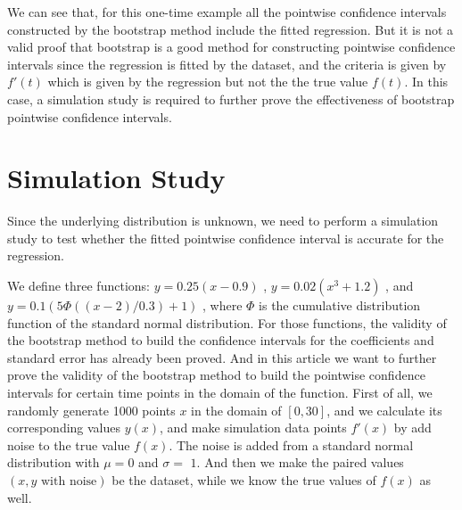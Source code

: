 \documentclass[12pt]{article}
\begin{document}
We can see that, for this one-time example all the pointwise confidence intervals constructed by the bootstrap method include the fitted regression. But it is not a valid proof that bootstrap is a good method for constructing pointwise confidence intervals since the regression is fitted by the dataset, and the criteria is given by \(f'(t)\) which is given by the regression but not the the true value \(f(t)\). In this case, a simulation study is required to further prove the effectiveness of bootstrap pointwise confidence intervals.









\section{Simulation Study}
\label{Simulation Study}


Since the underlying distribution is unknown, we need to perform a simulation study to test whether the fitted pointwise confidence interval is accurate for the regression.


We define three functions: \(y = 0.25(x - 0.9)\) , \(y = 0.02(x^3+1.2)\) , and \( y = 0.1 (5\Phi((x - 2) / 0.3) + 1)\) , where \(\Phi\) is the cumulative distribution function of the standard normal distribution. For those functions, the validity of the bootstrap method to build the confidence intervals for the coefficients and standard error has already been proved. \cite{jieying2022heteroscedastic} And in this article we want to further prove the validity of the bootstrap method to build the pointwise confidence intervals for certain time points in the domain of the function. First of all, we randomly generate 1000 points \(x\) in the domain of \([0,30]\), and we calculate its corresponding values \(y(x)\), and make simulation data points \(f'(x)\) by add noise to the true value \(f(x)\). The noise is added from a standard normal distribution with \(\mu = 0\) and \(\sigma = \) \(1\). And then we make the paired values \((x, y\text{ with noise})\) be the dataset, while we know the true values of \(f(x)\) as well. 
\end{document}
